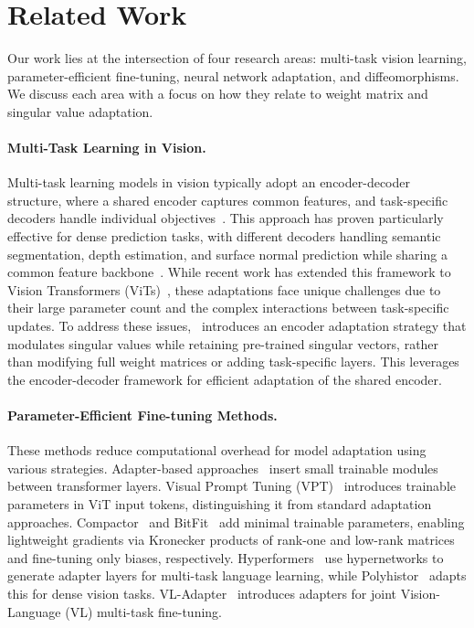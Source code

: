 \section{Related Work}
\label{sec:relatedwork}
Our work lies at the intersection of four research areas: multi-task vision  learning, parameter-efficient fine-tuning, neural network adaptation, and diffeomorphisms. We discuss each area with a focus on how they relate to weight matrix and singular value adaptation. 

\paragraph{Multi-Task Learning in Vision.} 
Multi-task learning models in vision typically adopt an encoder-decoder structure, where a shared encoder captures common features, and task-specific decoders handle individual objectives~\citep{misra2016cross}. This approach has proven particularly effective for dense prediction tasks, with different decoders handling semantic segmentation, depth estimation, and surface normal prediction while sharing a common feature backbone~\citep{kendall2018multi}. While recent work has extended this framework to Vision Transformers (ViTs)~\citep{dosovitskiy2021an}, these adaptations face unique challenges due to their large parameter count and the complex interactions between task-specific updates. 
To address these issues, \ourmethod\ introduces an encoder adaptation strategy that modulates singular values while retaining pre-trained singular vectors, rather than modifying full weight matrices or adding task-specific layers. This leverages the encoder-decoder framework for efficient adaptation of the shared encoder.

\paragraph{Parameter-Efficient Fine-tuning Methods.} 
These methods reduce computational overhead for model adaptation using various strategies. Adapter-based approaches~\citep{houlsby2019parameterefficienttransferlearningnlp} insert small trainable modules between transformer layers. Visual Prompt Tuning (VPT)~\citep{jia2022visual} introduces trainable parameters in ViT input tokens, distinguishing it from standard adaptation approaches. Compactor~\citep{mahabadi2021parameter} and BitFit~\citep{zaken2021bitfit} add minimal trainable parameters, enabling lightweight gradients via Kronecker products of rank-one and low-rank matrices and fine-tuning only biases, respectively. Hyperformers~\citep{mahabadi2021parameter} use hypernetworks to generate adapter layers for multi-task language learning, while Polyhistor~\citep{liu2022polyhistor} adapts this for dense vision tasks. VL-Adapter~\citep{sung2022vl} introduces adapters for joint Vision-Language (VL) multi-task fine-tuning.

